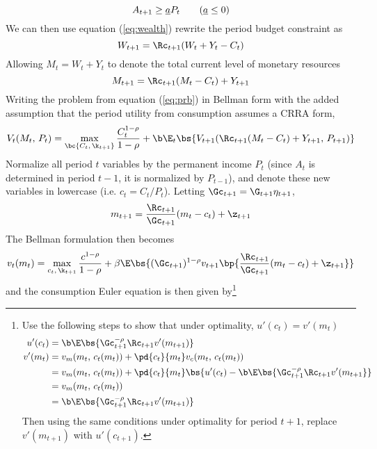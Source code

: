 \[
A_{t+1} \geq \underline{a}P_{t} \tag{$\underline{a} \leq 0$}
\]
We can then use equation (\ref{eq:wealth}) rewrite the period budget constraint as
\[
W_{t+1} = \Rc_{t+1}(W_{t} + Y_{t} - C_{t})
\]
Allowing $M_t = W_t + Y_t$ to denote the total current level of monetary resources
\[
M_{t+1} = \Rc_{t+1}(M_t - C_t) + Y_{t+1}
\]
Writing the problem from equation (\ref{eq:prb}) in Bellman form with the added assumption that the period utility from consumption assumes a CRRA form,
\begin{equation}
    V_t(M_t,\,P_t) = \max_{\bc{C_t,\,\k_{t+1}}}\frac{C_{t}^{1-\rho}}{1 - \rho} + \b \E_t\bs{V_{t+1}(\Rc_{t+1}(M_t - C_{t}) + Y_{t+1},\,P_{t+1})}
\end{equation}
Normalize all period $t$ variables by the permanent income $P_t$ (since $A_t$ is determined in period $t-1$, it is normalized by $P_{t-1}$), and denote these new variables in lowercase (i.e. $c_t = C_t / P_t$). Letting $\Gc_{t+1} = \G_{t+1}\eta_{t+1}$,
\begin{align*}
    m_{t+1} = \frac{\Rc_{t+1}}{\Gc_{t+1}}(m_t - c_t) + \z_{t+1}
\end{align*}
The Bellman formulation then becomes
\begin{equation}\label{eq:bellman}
    v_{t}(m_t) = \max_{c_{t},\,\k_{t+1}}\frac{c^{1-\rho}}{1-\rho} + \beta \E\bs{(\Gc_{t+1})^{1-\rho}v_{t+1}\bp{\frac{\Rc_{t+1}}{\Gc_{t+1}}(m_t - c_t) + \z_{t+1}}}
\end{equation}
and the consumption Euler equation is then given by\footnote{Use the following steps to show that under optimality, $u'(c_t) = v'(m_t)$
\begin{align*}
    u'(c_t) &= \b \E\bs{\Gc_{t+1}^{-\rho}\Rc_{t+1}v'(m_{t+1})}\\
    v'(m_t) &= v_{m}(m_t,\,c_t(m_t)) + \pd{c_t}{m_t}v_{c}(m_t,\,c_t(m_t))\\
    &= v_{m}(m_t,\,c_t(m_t)) + \pd{c_t}{m_t}\bs{u'(c_t) - \b \E\bs{\Gc_{t+1}^{-\rho}\Rc_{t+1}v'(m_{t+1}}}\\
    &= v_{m}(m_t,\,c_t(m_t))\\
    &= \b \E\bs{\Gc_{t+1}^{-\rho}\Rc_{t+1}v'(m_{t+1})}
\end{align*}
Then using the same conditions under optimality for period $t+1$, replace $v'(m_{t+1})$ with $u'(c_{t+1})$.
}
